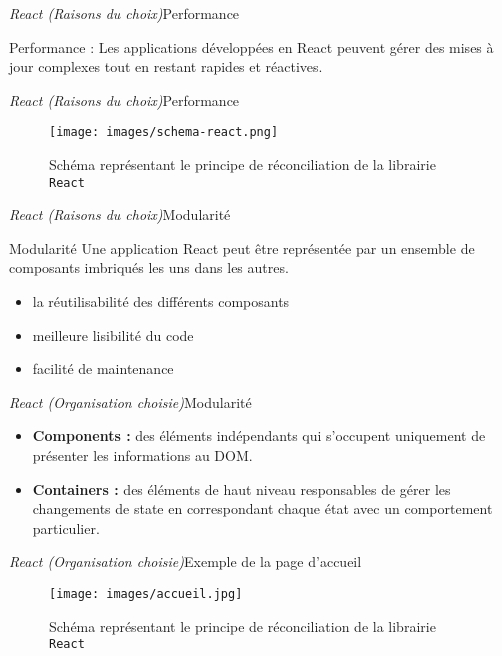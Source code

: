 \documentclass[usenames,dvipsnames]{beamer}
\begin{document}
\begin{frame}{\textit{React (Raisons du choix)}}{Performance}
  \begin{block}{Performance :}
  Les applications développées en React peuvent gérer des mises à jour complexes tout en restant rapides et réactives.
  \end{block}
\end{frame}

\begin{frame}{\textit{React (Raisons du choix)}}{Performance}
  \begin{figure}
    \texttt{[image: images/schema-react.png]}
    \caption{Schéma représentant le principe de réconciliation de la librairie \texttt{React}}
  \end{figure}
\end{frame}

\begin{frame}{\textit{React (Raisons du choix)}}{Modularité}
  \begin{block}{Modularité}
  Une application React peut être représentée par un ensemble de composants imbriqués les uns dans les autres.
  \end{block}

  \begin{itemize}
    \item la réutilisabilité des différents composants
    \item meilleure lisibilité du code
    \item facilité de maintenance
  \end{itemize}
\end{frame}

\begin{frame}{\textit{React (Organisation choisie)}}{Modularité}
  \begin{itemize}
    \item \textbf{Components :} des éléments indépendants qui s’occupent uniquement de présenter les informations au DOM.
    \item \textbf{Containers :} des éléments de haut  niveau responsables de gérer les changements de state en correspondant chaque état avec un comportement particulier.
  \end{itemize}
\end{frame}

\begin{frame}{\textit{React (Organisation choisie)}}{Exemple de la page d'accueil}
  \begin{figure}
    \texttt{[image: images/accueil.jpg]}
    \caption{Schéma représentant le principe de réconciliation de la librairie \texttt{React}}
  \end{figure}
\end{frame}
\end{document}
